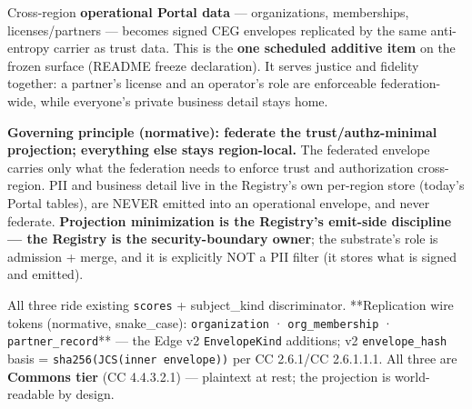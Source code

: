 \documentclass[11pt]{article}
\begin{document}
Cross-region \textbf{operational Portal data} — organizations, memberships, licenses/partners — becomes signed CEG envelopes replicated by the same anti-entropy carrier as trust data. This is the \textbf{one scheduled additive item} on the frozen surface (README freeze declaration). It serves justice and fidelity together: a partner's license and an operator's role are enforceable federation-wide, while everyone's private business detail stays home.


\textbf{Governing principle (normative): federate the trust/authz-minimal projection; everything else stays region-local.} The federated envelope carries only what the federation needs to enforce trust and authorization cross-region. PII and business detail live in the Registry's own per-region store (today's Portal tables), are NEVER emitted into an operational envelope, and never federate. \textbf{Projection minimization is the Registry's emit-side discipline — the Registry is the security-boundary owner}; the substrate's role is admission + merge, and it is explicitly NOT a PII filter (it stores what is signed and emitted).


All three ride existing \texttt{scores} + subject\_kind discriminator. **Replication wire tokens (normative, snake\_case): \texttt{organization} · \texttt{org\_membership} · \texttt{partner\_record}** — the Edge v2 \texttt{EnvelopeKind} additions; v2 \texttt{envelope\_hash} basis = \texttt{sha256(JCS(inner envelope))} per CC 2.6.1/CC 2.6.1.1.1. All three are \textbf{Commons tier} (CC 4.4.3.2.1) — plaintext at rest; the projection is world-readable by design.
\end{document}
